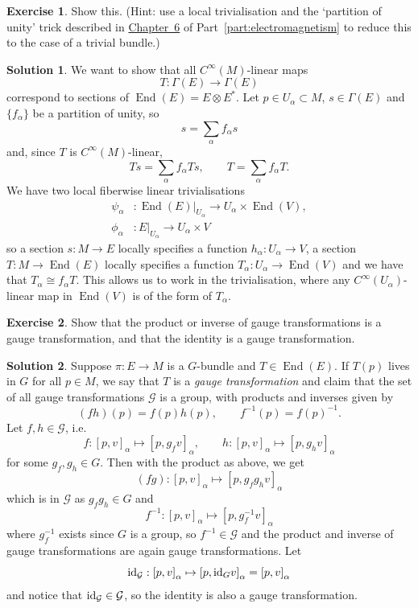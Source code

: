 \documentclass[11pt, a4paper]{report}
\theoremstyle{definition}
\newtheorem{exercise}{Exercise}[part]
\newtheorem{solution}{Solution}[part]
\newenvironment{ex}{\begin{exercise}}{\end{exercise}\pagebreak[1]}
\newenvironment{sol}{\begin{solution}}{\end{solution}\pagebreak[3]}
\newcommand*{\op}[1]{\ensuremath\mathop{}\mathopen{}#1}
\DeclareMathOperator{\End}{End}
\newcommand*{\id}{\op{\mathrm{id}}}
\begin{document}
\begin{ex}

Show this.
(Hint: use a local trivialisation and the `partition of unity' trick described in \hyperref[ch:derhamtheory]{Chapter~6} of Part~\ref{part:electromagnetism} to reduce this to the case of a trivial bundle.)

\end{ex}

\begin{sol}

We want to show that all $C^\infty(M)$-linear maps
\[
    T: \Gamma(E) \to \Gamma(E)
\]
correspond to sections of $\End(E) = E \otimes E^*$.
Let $p \in U_\alpha \subset M$, $s \in \Gamma(E)$ and $\{f_\alpha\}$ be a partition of unity, so
\[
    s = \sum_\alpha f_\alpha s
\]
and, since $T$ is $C^\infty(M)$-linear,
\[
    Ts = \sum_\alpha f_\alpha Ts, \qquad
    T = \sum_\alpha f_\alpha T.
\]
We have two local fiberwise linear trivialisations
\begin{align*}
    \psi_\alpha &: \End(E)|_{U_\alpha} \to U_\alpha \times \End(V), \\
    \phi_\alpha &: E|_{U_\alpha} \to U_\alpha \times V
\end{align*}
so a section $s: M \to E$ locally specifies a function $h_\alpha: U_\alpha \to V$,
a section $T: M \to \End(E)$ locally specifies a function $T_\alpha: U_\alpha \to \End(V)$ and we have that $T_\alpha \cong f_\alpha T$.
This allows us to work in the trivialisation, where any $C^\infty(U_\alpha)$-linear map in $\End(V)$ is of the form of $T_\alpha$.

\end{sol}

\begin{ex}

Show that the product or inverse of gauge transformations is a gauge transformation, and that the identity is a gauge transformation.

\end{ex}

\begin{sol}

Suppose $\pi: E \to M$ is a $G$-bundle and $T \in \End(E)$. If $T(p)$ lives in $G$ for all $p \in M$, we say that $T$ is a \emph{gauge transformation} and claim that the set of all gauge transformations $\mathcal{G}$ is a group, with products and inverses given by
\[
    (fh)(p) = f(p) h(p), \qquad f^{-1}(p) = {f(p)}^{-1}.
\]
Let $f, h \in \mathcal{G}$, i.e.
\[
    f: {[p, v]}_\alpha \mapsto {[p, g_f v]}_\alpha, \qquad
    h: {[p, v]}_\alpha \mapsto {[p, g_h v]}_\alpha
\]
for some $g_f, g_h \in G$. Then with the product as above, we get
\[
    (fg): {[p, v]}_\alpha \mapsto {[p, g_f g_h v]}_\alpha
\]
which is in $\mathcal{G}$ as $g_f g_h \in G$ and
\[
    f^{-1}: {[p, v]}_\alpha \mapsto {[p, g_f^{-1} v]}_\alpha
\]
where $g_f^{-1}$ exists since $G$ is a group, so $f^{-1} \in \mathcal{G}$ and the product and inverse of gauge transformations are again gauge transformations.
Let
\[
    \id_\mathcal{G}: {[p, v]}_\alpha \mapsto {[p, \id_G v]}_\alpha = {[p, v]}_\alpha
\]
and notice that $\id_\mathcal{G} \in \mathcal{G}$, so the identity is also a gauge transformation.

\end{sol}
\end{document}

